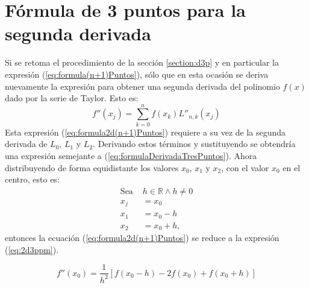 \section{Fórmula de 3 puntos para la segunda derivada}
Si se retoma el procedimiento de la sección \ref{section:d3p} y en particular la expresión (\ref{eq:formula(n+1)Puntos}), sólo
que en esta ocasión se deriva nuevamente la expresión para obtener una segunda derivada del polinomio $f(x)$ dado por la serie 
de Taylor. Esto es:
\begin{equation}
	f''(x_j) = \sum_{k=0}^n f(x_k)L''_{n,k}(x_j)
	\label{eq:formula2d(n+1)Puntos} 
\end{equation}
Esta expresión (\ref{eq:formula2d(n+1)Puntos}) requiere a su vez de la segunda derivada de $L_0$, $L_1$ y $L_2$. Derivando estos
términos y sustituyendo se obtendría una expresión semejante a (\ref{eq:formulaDerivadaTresPuntos}). Ahora distribuyendo de 
forma equidistante los valores $x_0$, $x_1$ y $x_2$, con el valor $x_0$ en el centro, esto es:
\begin{align*}
	\mbox{Sea }& h\in\mathbb{R} \wedge h\not=0 \\
	x_j &= x_0\\
	x_1 &= x_0 - h \\ 
	x_2 &= x_0 + h,
\end{align*}
entonces la ecuación (\ref{eq:formula2d(n+1)Puntos}) se reduce a la expresión (\ref{eq:2d3ppm}).
\begin{definitionT}
	\begin{equation}
		f''(x_0) = \frac{1}{h^2}\left[f(x_0-h) - 2f(x_0) + f(x_0+h)\right] 
		\label{eq:2d3ppm}
	\end{equation}
\end{definitionT}


